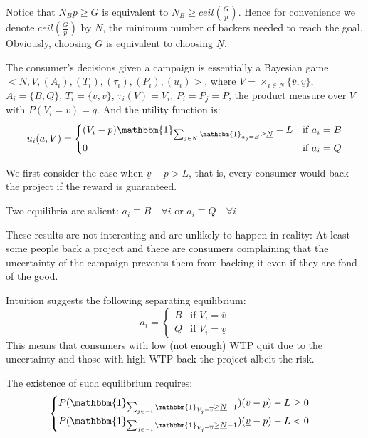 \documentclass{article}
\begin{document}
Notice that $N_B p \geq G$ is equivalent to
$N_B \geq ceil(\frac{G}{p}) $. Hence for convenience
we denote $ceil(\frac{G}{p})$ by $\underline{N}$, the
minimum number of backers needed to reach the goal.
Obviously, choosing $G$ is equivalent to choosing $\underline{N}$.

The consumer's decisions given a campaign is essentially a
Bayesian game $ <N,V,(A_i),(T_i),(\tau_i),(P_i),(u_i)> $,
where $V = \times_{i \in N} \{\overline{v},\underline{v}\} $,
$A_i = \{B,Q\}$, $T_i = \{\overline{v},\underline{v}\}$,
$\tau_i(V) = V_i$, $P_i = P_j = P$, the product measure
over $V$ with $P(V_i = \overline{v}) = q$. And the utility
function is:
\begin{equation}
    u_i(a,V) = \begin{cases}
        (V_i - p)\mathbbm{1}_{\sum_{j \in N} \mathbbm{1}_{a_j = B} \geq \underline{N}} - L & \text{if } a_i = B \\
        0 & \text{if } a_i = Q
    \end{cases}
\end{equation}

We first consider the case when $\underline{v} - p > L$, that is,
every consumer would back the project if the reward is guaranteed.

Two equilibria are salient:
$a_i \equiv B \quad \forall i$ or $a_i \equiv Q \quad \forall i$

These results are not interesting and are unlikely to happen in reality:
At least some people back a project and there are consumers complaining
that the uncertainty of the campaign prevents them from
backing it even if they are fond of the good.

Intuition suggests the following separating equilibrium:
\begin{equation}
    a_i = \begin{cases}
        B & \text{if } V_i = \overline{v} \\
        Q & \text{if } V_i = \underline{v}
    \end{cases}
\end{equation}
This means that consumers with low (not enough) WTP
quit due to the uncertainty and those with high WTP
back the project albeit the risk.

The existence of such equilibrium requires:
\begin{equation}
    \begin{cases}
        P(\mathbbm{1}_{\sum_{j \in -i} \mathbbm{1}_{V_j = \overline{v}} \geq \underline{N} - 1})
        (\overline{v}-p) - L \geq 0 \\
        P(\mathbbm{1}_{\sum_{j \in -i} \mathbbm{1}_{V_j = \overline{v}} \geq \underline{N} - 1})
        (\underline{v} - p) - L < 0
    \end{cases}
\end{equation}
\end{document}
